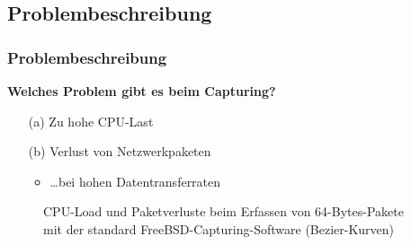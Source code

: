 \documentclass{beamer}
\begin{document}
\subsection*{Problembeschreibung}
\begin{frame}
\frametitle{Problembeschreibung}
\textbf{Welches Problem gibt es beim Capturing?}
\begin{itemize}
	\item[(a)] Zu hohe CPU-Last
	\item[(b)] Verlust von Netzwerkpaketen
		\begin{itemize}
			\item \ldots bei hohen Datentransferraten \newline
		\end{itemize}
\end{itemize}
\begin{figure}[H] 
	\caption{CPU-Load und Paketverluste beim Erfassen von 64-Bytes-Pakete mit der standard FreeBSD-Capturing-Software (Bezier-Kurven)}
\end{figure}
\end{frame}
\end{document}
